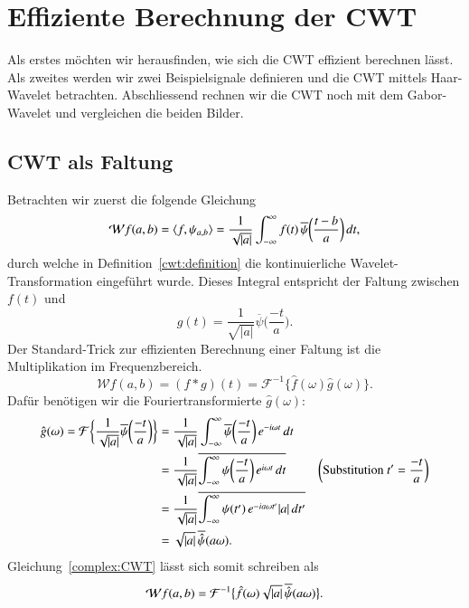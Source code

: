 \section{Effiziente Berechnung der CWT}
Als erstes möchten wir herausfinden, wie sich die CWT effizient berechnen lässt.
Als zweites werden wir zwei Beispielsignale definieren und die CWT mittels Haar-Wavelet betrachten.
Abschliessend rechnen wir die CWT noch mit dem Gabor-Wavelet und vergleichen die beiden Bilder.

\subsection{CWT als Faltung}
Betrachten wir zuerst die folgende Gleichung
\begin{equation}
\Wave f (a,b)
=
\langle f,\psi_{a,b}\rangle
=
\frac{1}{\sqrt{|a|}}\int_{-\infty}^\infty f(t)\,
	\overline{\psi}\biggl(\frac{t-b}{a}\biggr)\,dt,\label{complex:CWT}
\end{equation}
durch welche in Definition~\ref{cwt:definition} die kontinuierliche Wavelet-Transformation eingeführt wurde.
Dieses Integral entspricht der Faltung zwischen $f(t)$ und 
\begin{equation} 
    g(t) 
    = \frac{1}{\sqrt{|a|}} \overline\psi\biggl(\frac{-t}{a}\biggr).
\end{equation}
Der Standard-Trick zur effizienten Berechnung einer Faltung ist die Multiplikation im Frequenzbereich.
\begin{equation} 
\mathcal{W}f (a,b) = (f*g)(t) = \mathcal{F}^{-1}\biggl\lbrace\hat f(\omega) \hat g (\omega) \biggr\rbrace.
\end{equation}
Dafür benötigen wir die Fouriertransformierte $\hat g (\omega)$:
\begin{align*}
	\hat g (\omega) = 
    \Four\,\biggl\lbrace \frac{1}{\sqrt{|a|}} \overline\psi \biggl(\frac{-t}{a}\biggr) \biggr\rbrace 
	&= \frac{1}{\sqrt{|a|}} \int_{-\infty}^{\infty}\overline\psi\biggl(\frac{-t}{a}\biggr) \, e^{-i\omega t}\,dt\\
	&= \frac{1}{\sqrt{|a|}} \overline{\int_{-\infty}^{\infty}\psi \biggl(\frac{-t}{a}\biggr) \, e^{i\omega t}\,dt}  
    & \biggl(\text{Substitution } t' = \frac{-t}{a}\biggr)\\
	&= \frac{1}{\sqrt{|a|}} \overline{\int_{-\infty}^{\infty}\psi(t') \, e^{-ia\omega t'} |a|\,dt'}\\
	&= \sqrt{|a|} \, \overline{\hat{\psi}}(a\omega).
\end{align*}
Gleichung~\eqref{complex:CWT} lässt sich somit schreiben als
\begin{equation}
\Wave f(a,b)
= \mathcal{F}^{-1}\bigl\lbrace\hat{f}(\omega) \sqrt{|a|}\, \overline{\hat{\psi}}(a\omega)\bigr\rbrace. \label{complex:fcwt}
\end{equation}

